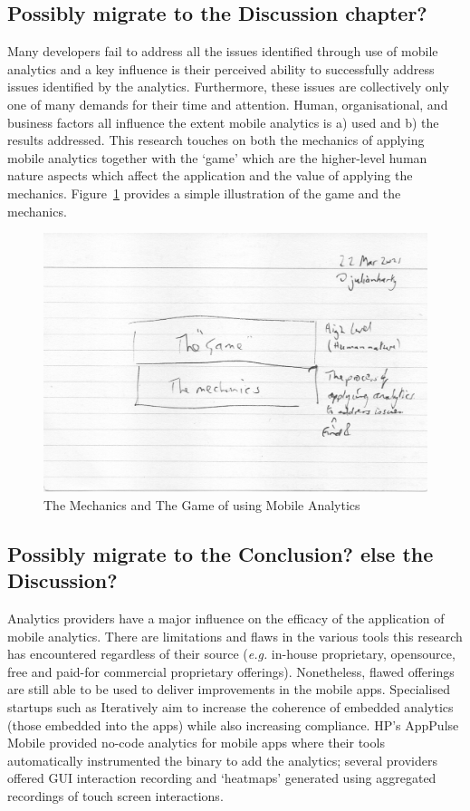 \clearpage
\subsection{Possibly migrate to the Discussion chapter?}
Many developers fail to address all the issues identified through use of mobile analytics and a key influence is their perceived ability to successfully address issues identified by the analytics. Furthermore, these issues are collectively only one of many demands for their time and attention. Human, organisational, and business factors all influence the extent mobile analytics is a) used and b) the results addressed. This research touches on both the mechanics of applying mobile analytics together with the `game' which are the higher-level human nature aspects which affect the application and the value of applying the mechanics. Figure~\ref{fig:the-mechanics-the-game} provides a simple illustration of the game and the mechanics.

\begin{figure}
    \centering
    \includegraphics[width=15cm]{images/rough-sketches/The-Mechanics-The-Game.jpeg}
    \caption{The Mechanics and The Game of using Mobile Analytics}
    \label{fig:the-mechanics-the-game}
\end{figure}

\clearpage
\subsection{Possibly migrate to the Conclusion? else the Discussion?}
Analytics providers have a major influence on the efficacy of the application of mobile analytics. There are limitations and flaws in the various tools this research has encountered regardless of their source (\emph{e.g.} in-house proprietary, opensource, free and paid-for commercial proprietary offerings). Nonetheless, flawed offerings are still able to be used to deliver improvements in the mobile apps. Specialised startups such as Iteratively aim to increase the coherence of embedded analytics (those embedded into the apps) while also increasing compliance. HP's AppPulse Mobile provided no-code analytics for mobile apps where their tools automatically instrumented the binary to add the analytics; several providers offered GUI interaction recording and `heatmaps' generated using aggregated recordings of touch screen interactions.

